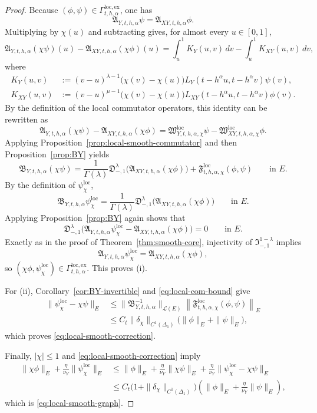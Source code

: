 \documentclass[11pt,a4paper]{amsart}
\theoremstyle{plain}
\theoremstyle{definition}
\theoremstyle{remark}
\begin{document}
\begin{proof}
Because \((\phi,\psi)\in\Gamma_{t,h,\alpha}^{\mathrm{loc,ex}}\), one has
\[
\mathfrak A_{Y,t,h,\alpha}\psi=\mathfrak A_{XY,t,h,\alpha}\phi.
\]
Multiplying by \(\chi(u)\) and subtracting gives, for almost every \(u\in[0,1]\),
\[
\mathfrak A_{Y,t,h,\alpha}(\chi\psi)(u)-\mathfrak A_{XY,t,h,\alpha}(\chi\phi)(u)
=
\int_u^1 K_Y(u,v)\,dv-\int_u^1 K_{XY}(u,v)\,dv,
\]
where
\begin{align*}
K_Y(u,v)
&:=
(v-u)^{\lambda-1}\bigl(\chi(v)-\chi(u)\bigr)
L_Y(t-h^\alpha u,t-h^\alpha v)\psi(v),\\
K_{XY}(u,v)
&:=
(v-u)^{\mu-1}\bigl(\chi(v)-\chi(u)\bigr)
L_{XY}(t-h^\alpha u,t-h^\alpha v)\phi(v).
\end{align*}
By the definition of the local commutator operators, this identity can be rewritten as
\[
\mathfrak A_{Y,t,h,\alpha}(\chi\psi)-\mathfrak A_{XY,t,h,\alpha}(\chi\phi)
=
\mathfrak W_{Y,t,h,\alpha,\chi}^{\mathrm{loc}}\psi
-\mathfrak W_{XY,t,h,\alpha,\chi}^{\mathrm{loc}}\phi.
\]
Applying Proposition~\ref{prop:local-smooth-commutator} and then
Proposition~\ref{prop:BY} yields
\[
\mathfrak B_{Y,t,h,\alpha}(\chi\psi)
=
\frac{1}{\Gamma(\lambda)}
\mathfrak D_{-,1}^{\lambda}
\bigl(\mathfrak A_{XY,t,h,\alpha}(\chi\phi)\bigr)
+
\mathfrak F_{t,h,\alpha,\chi}^{\mathrm{loc}}(\phi,\psi)
\qquad\text{in }E.
\]
By the definition of \(\psi_{\chi}^{\mathrm{loc}}\),
\[
\mathfrak B_{Y,t,h,\alpha}\psi_{\chi}^{\mathrm{loc}}
=
\frac{1}{\Gamma(\lambda)}
\mathfrak D_{-,1}^{\lambda}
\bigl(\mathfrak A_{XY,t,h,\alpha}(\chi\phi)\bigr)
\qquad\text{in }E.
\]
Applying Proposition~\ref{prop:BY} again shows that
\[
\mathfrak D_{-,1}^{\lambda}
\bigl(
\mathfrak A_{Y,t,h,\alpha}\psi_{\chi}^{\mathrm{loc}}
-\mathfrak A_{XY,t,h,\alpha}(\chi\phi)
\bigr)
=
0
\qquad\text{in }E.
\]
Exactly as in the proof of Theorem~\ref{thm:smooth-core}, injectivity of
\(\mathfrak I_{-,1}^{1-\lambda}\) implies
\[
\mathfrak A_{Y,t,h,\alpha}\psi_{\chi}^{\mathrm{loc}}
=
\mathfrak A_{XY,t,h,\alpha}(\chi\phi),
\]
so \((\chi\phi,\psi_{\chi}^{\mathrm{loc}})\in \Gamma_{t,h,\alpha}^{\mathrm{loc,ex}}\). This
proves (i).

For (ii), Corollary~\ref{cor:BY-invertible} and \eqref{eq:local-com-bound} give
\begin{align*}
\|\psi_{\chi}^{\mathrm{loc}}-\chi\psi\|_E
&\le
\|\mathfrak B_{Y,t,h,\alpha}^{-1}\|_{\mathcal L(E)}
\left\|
\mathfrak F_{t,h,\alpha,\chi}^{\mathrm{loc}}(\phi,\psi)
\right\|_E\\
&\le
C_t\|\delta_\chi\|_{C^1(\Delta_1)}
\bigl(\|\phi\|_E+\|\psi\|_E\bigr),
\end{align*}
which proves \eqref{eq:local-smooth-correction}.

Finally, \(|\chi|\le1\) and \eqref{eq:local-smooth-correction} imply
\begin{align*}
\|\chi\phi\|_E+\frac{\eta}{\nu_Y}\|\psi_{\chi}^{\mathrm{loc}}\|_E
&\le
\|\phi\|_E+\frac{\eta}{\nu_Y}\|\chi\psi\|_E
+\frac{\eta}{\nu_Y}\|\psi_{\chi}^{\mathrm{loc}}-\chi\psi\|_E\\
&\le
C_t\bigl(1+\|\delta_\chi\|_{C^1(\Delta_1)}\bigr)
\left(
\|\phi\|_E+\frac{\eta}{\nu_Y}\|\psi\|_E
\right),
\end{align*}
which is \eqref{eq:local-smooth-graph}.
\end{proof}
\end{document}
